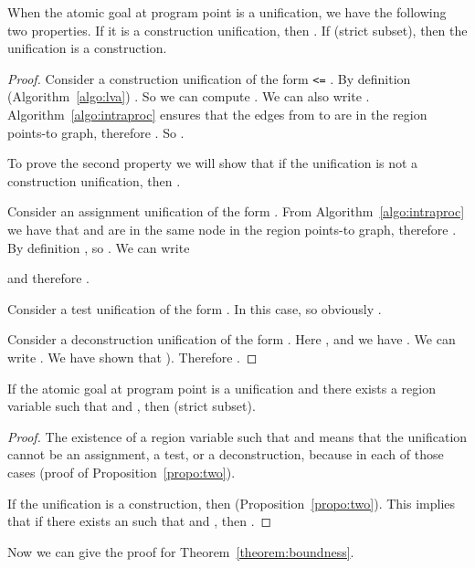\documentclass{tlp}
\newcommand{\code}[1]{{\tt#1}}
\begin{document}
\begin{proposition}
\label{propo:two}
    When the atomic goal at program point  is a unification,
    we have the following two properties.
    If it is a construction unification, then .
    If  (strict subset),
    then the unification is a construction.
\end{proposition}
\begin{proof}
    Consider a construction unification
    of the form  \code{<=} .
    By definition (Algorithm~\ref{algo:lva})
    .
    So we can compute .
     We can also write .
    Algorithm~\ref{algo:intraproc} ensures that
    the edges from  to  are in the region points-to graph,
    therefore
    .
    So .

    To prove the second property we will show that
    if the unification is not a construction unification,
    then .

    Consider an assignment unification of the form .
    From Algorithm~\ref{algo:intraproc} we have that
     and  are in the same node in the region points-to graph,
    therefore .
    By definition , so
    .
    We can write
    
    and therefore .

    Consider a test unification of the form .
    In this case, 
    so obviously .

    Consider a deconstruction unification of the form
    .
    Here ,
    and we have .
    We can write .
    We have shown that
    ).
    Therefore .
\end{proof}

\begin{proposition}
\label{propo:three}
    If the atomic goal at program point  is a unification
    and there exists a region variable  such that
     and ,
    then  (strict subset).
\end{proposition}
\begin{proof}
    The existence of a region variable  such that
     and  means that the unification
    cannot be an assignment, a test, or a deconstruction,
    because in each of those cases 
    (proof of Proposition~\ref{propo:two}).

    If the unification is a construction,
    then  (Proposition~\ref{propo:two}).
    This implies that if there exists an 
    such that  and ,
    then .
\end{proof}

Now we can give the proof for Theorem~\ref{theorem:boundness}.
\end{document}
